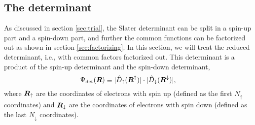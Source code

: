 \subsection{The determinant} \label{sec:slaterdeterminant}
As discussed in section \ref{sec:trial}, the Slater determinant can be split in a spin-up part and a spin-down part, and further the common functions can be factorized out as shown in section \ref{sec:factorizing}. In this section, we will treat the reduced determinant, i.e., with common factors factorized out. This determinant is a product of the spin-up determinant and the spin-down determinant,
\begin{equation}
\Psi_{\text{det}}(\boldsymbol{{R}})\equiv |\hat{D}_{\uparrow}(\boldsymbol{{R}}^{\uparrow})|\cdot |\hat{D}_{\downarrow}(\boldsymbol{{R}}^{\downarrow})|,
\end{equation}
where $\boldsymbol{{R}}_{\uparrow}$ are the coordinates of electrons with spin up (defined as the first $N_{\uparrow}$ coordinates) and $\boldsymbol{{R}}_{\downarrow}$ are the coordinates of electrons with spin down (defined as the last $N_{\downarrow}$ coordinates). 

